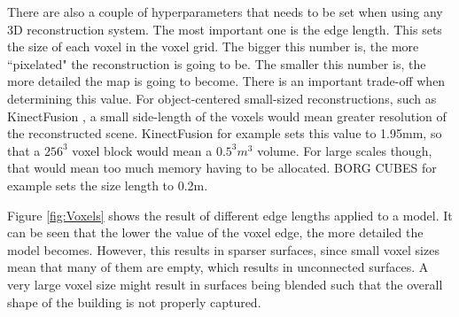 \documentclass[11pt]{article}
\begin{document}
There are also a couple of hyperparameters that needs to be set when using any 3D reconstruction system. The most important one is the edge length. This sets the size of each voxel in the voxel grid. The bigger this number is, the more ``pixelated" the reconstruction is going to be. The smaller this number is, the more detailed the map is going to become. There is an important trade-off when determining this value. For object-centered small-sized reconstructions, such as KinectFusion \cite{kinectfusion}, a small side-length of the voxels would mean greater resolution of the reconstructed scene. KinectFusion for example sets this value to	 1.95mm, so that a $256^3$ voxel block would mean a $0.5^3 m^3$ volume. For large scales though, that would mean too much memory having to be allocated. BORG CUBES for example sets the size length to 0.2m.
	
Figure \ref{fig:Voxels} shows the result of different edge lengths applied to a model. It can be seen that the lower the value of the voxel edge, the more detailed the model becomes. However, this results in sparser surfaces, since small voxel sizes mean that many of them are empty, which results in unconnected surfaces. A very large voxel size might result in surfaces being blended such that the overall shape of the building is not properly captured.
\end{document}
